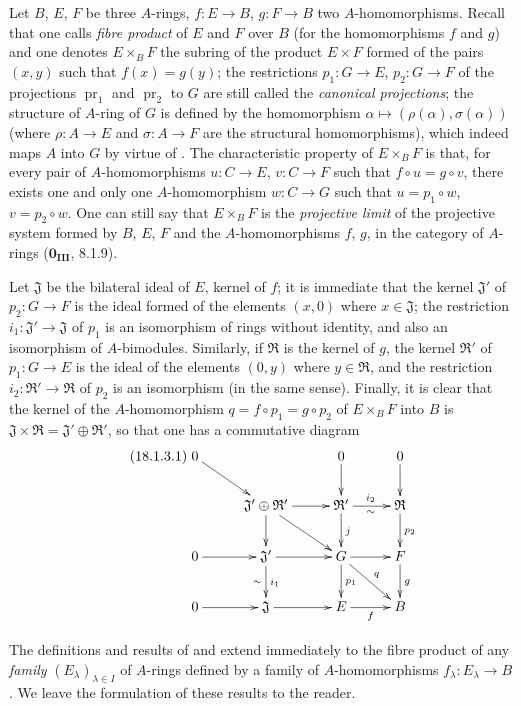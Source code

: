 \begin{env}[18.1.2]
\label{0.18.1.2}
Let $B$, $E$, $F$ be three $A$-rings, $f:E\to B$, $g:F\to B$ two $A$-homomorphisms.
Recall that one calls \emph{fibre product} of $E$ and $F$ over $B$ (for the homomorphisms $f$ and $g$) and one denotes $E\times_B F$ the subring of the product $E\times F$ formed of the pairs $(x,y)$ such that $f(x)=g(y)$; the restrictions $p_1:G\to E$, $p_2:G\to F$ of the projections $\operatorname{pr}_1$ and $\operatorname{pr}_2$ to $G$ are still called the \emph{canonical projections};
the structure of $A$-ring of $G$ is defined by the homomorphism $\alpha\mapsto(\rho(\alpha),\sigma(\alpha))$ (where $\rho:A\to E$ and $\sigma:A\to F$ are the structural homomorphisms), which indeed maps $A$ into $G$ by virtue of .
The characteristic property of $E\times_B F$ is that, for every pair of $A$-homomorphisms $u:C\to E$, $v:C\to F$ such that $f\circ u=g\circ v$, there exists one and only one $A$-homomorphism $w:C\to G$ such that $u=p_1\circ w$, $v=p_2\circ w$.
One can still say that $E\times_B F$ is the \emph{projective limit} of the projective system formed by $B$, $E$, $F$ and the $A$-homomorphisms $f$, $g$, in the category of $A$-rings ($\mathbf{0_{III}}$, 8.1.9).
\end{env}

\begin{env}[18.1.3]
\label{0.18.1.3}
Let $\mathfrak{J}$ be the bilateral ideal of $E$, kernel of $f$; it is immediate that the kernel $\mathfrak{J}'$ of $p_2:G\to F$ is the ideal formed of the elements $(x,0)$ where $x\in\mathfrak{J}$; the restriction $i_1:\mathfrak{J}'\to\mathfrak{J}$ of $p_1$ is an isomorphism of rings without identity, and also an isomorphism of $A$-bimodules.
Similarly, if $\mathfrak{R}$ is the kernel of $g$, the kernel $\mathfrak{R}'$ of $p_1:G\to E$ is the ideal of the elements $(0,y)$ where $y\in\mathfrak{R}$, and the restriction $i_2:\mathfrak{R}'\to\mathfrak{R}$ of $p_2$ is an isomorphism (in the same sense).
Finally, it is clear that the kernel of the $A$-homomorphism $q=f\circ p_1=g\circ p_2$ of $E\times_B F$ into $B$ is $\mathfrak{J}\times\mathfrak{R}=\mathfrak{J}'\oplus\mathfrak{R}'$, so that one has a commutative diagram
\begin{equation}
\tag{18.1.3.1}
  \label{0.18.1.3.1}
  \xymatrix@C=2.2pc@R=1.8pc{
    0\ar[dr] & & 0\ar[d] & 0\ar[d]\\
    & \mathfrak{J}'\oplus\mathfrak{R}'\ar[r]\ar[d]\ar[dr]
      & \mathfrak{R}'\ar[r]^{i_2}_{\sim}\ar[d]^j
      & \mathfrak{R}\ar[d]^{p_2}\\
    0\ar[r] & \mathfrak{J}'\ar[r]\ar[d]^{i_1}_{\sim}
      & G\ar[r]\ar[d]^{p_1}\ar[dr]^q & F\ar[d]^g\\
    0\ar[r] & \mathfrak{J}\ar[r] & E\ar[r]_f & B
  }
\end{equation}

The definitions and results of  and  extend immediately to the fibre product of any \emph{family} $(E_\lambda)_{\lambda\in I}$ of $A$-rings defined by a family of $A$-homomorphisms $f_\lambda:E_\lambda\to B$.
We leave the formulation of these results to the reader.
\end{env}

